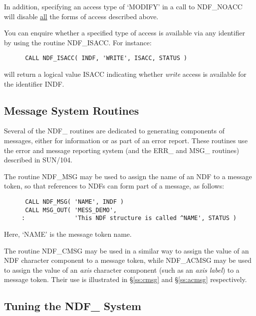\documentclass[twoside,11pt]{article}
\newcommand{\htmlref}[2]{#1}
\newcommand{\xref}[3]{#1}
\newcommand{\xlabel}[1]{}
\newcommand{\st}[1]{{\em{#1}}}
\begin{document}
In addition, specifying an access type of `MODIFY' in a call to NDF\_NOACC 
will disable \underline{all} the forms of access described above.

You can enquire whether a specified type of access is available via any 
identifier by using the routine \htmlref{NDF\_ISACC}{NDF_ISACC}. 
For instance: 

\small
\begin{verbatim}
      CALL NDF_ISACC( INDF, 'WRITE', ISACC, STATUS )
\end{verbatim}
\normalsize

will return a logical value ISACC indicating whether \st{write\/} access is
available for the identifier INDF. 

\subsection{\xlabel{message_system_routines}Message System Routines}

Several of the NDF\_ routines are dedicated to generating components
of messages, either for information or as part of an error report.
These routines use the error and message reporting system (and the
ERR\_ and MSG\_ routines) described in \xref{SUN/104}{sun104}{}.

The routine \htmlref{NDF\_MSG}{NDF_MSG} may be used to assign the name of an NDF to a message
token, so that references to NDFs can form part of a message, as follows: 

\small
\begin{verbatim}
      CALL NDF_MSG( 'NAME', INDF )
      CALL MSG_OUT( 'MESS_DEMO',
     :              'This NDF structure is called ^NAME', STATUS )
\end{verbatim}
\normalsize

Here, `NAME' is the message token name.

The routine \htmlref{NDF\_CMSG}{NDF_CMSG} may be used in a similar way to assign the value of an
NDF character component to a message token, while \htmlref{NDF\_ACMSG}{NDF_ACMSG} may be used to
assign the value of an \st{axis\/} character component (such as an
\st{axis label\/}) to a message token.  
Their use is illustrated in \S\ref{ss:cmsg} and \S\ref{ss:acmsg}
respectively. 

\subsection{\xlabel{tuning_the_ndf_system}\label{ss:tuning}Tuning the NDF\_ System}
\end{document}
